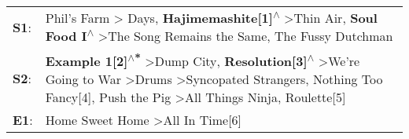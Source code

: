 \begin{supertabular}{p{0.03\textwidth}p{0.92\textwidth}}
 \textbf{S1}:  &                                                                                                                                                          Phil's Farm\textsuperscript{} \textgreater {} Days\textsuperscript{}, \enspace \textbf{Hajimemashite[1]\textsuperscript{$\wedge$}} \textgreater \enspace Thin Air\textsuperscript{}, \enspace \textbf{Soul Food I\textsuperscript{$\wedge$}} \textgreater \enspace The Song Remains the Same\textsuperscript{}, \enspace The Fussy Dutchman\textsuperscript{}  \enspace  \\
 \textbf{S2}:  &  \textbf{Example 1[2]\textsuperscript{$\wedge$*}} \textgreater \enspace Dump City\textsuperscript{}, \enspace \textbf{Resolution[3]\textsuperscript{$\wedge$}} \textgreater \enspace We're Going to War\textsuperscript{} \textgreater \enspace Drums\textsuperscript{} \textgreater \enspace Syncopated Strangers\textsuperscript{}, \enspace Nothing Too Fancy[4]\textsuperscript{}, \enspace Push the Pig\textsuperscript{} \textgreater \enspace All Things Ninja\textsuperscript{}, \enspace Roulette[5]\textsuperscript{}  \enspace  \\
 \textbf{E1}:  &                                                                                                                                                                                                                                                                                                                                                                                                                                        Home Sweet Home\textsuperscript{} \textgreater \enspace All In Time[6]\textsuperscript{}  \enspace  \\
\end{supertabular}
